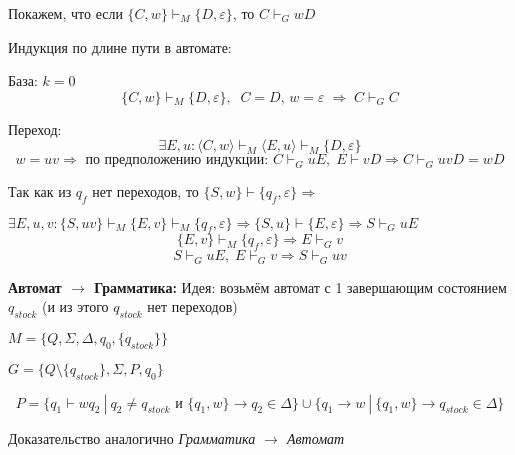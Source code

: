 Покажем, что если $\{C, w\} \vdash_{M} \{D, \varepsilon\}$, 
то $C \vdash_{G} wD$

Индукция по длине пути в автомате:

База: $k = 0$
$$
\{C, w\} \vdash_{M} 
\{D, \varepsilon\},  \;\; C = D, \, w = \varepsilon \;\Rightarrow\;
C \vdash_{G} C
$$

Переход:
$$
\exists E, u : \langle C, w\rangle \vdash_{M} \langle E, u\rangle \vdash_{M} \{D, \varepsilon\}
$$
$$
w = uv \Rightarrow \text{ по предположению индукции: }
C \vdash_{G} uE, \; E \vdash vD \Rightarrow
C \vdash_{G} uvD = wD
$$

Так как из $q_f$ нет переходов, то $\{S, w\} \vdash \{q_f, \varepsilon\} \Rightarrow$

$\exists E, u, v: \{S, uv\} \vdash_{M} 
\{E, v\} \vdash_{M} 
\{q_f, \varepsilon\} \Rightarrow
\{S, u\} \vdash \{E, \varepsilon\} \Rightarrow
S \vdash_{G} uE
$
$$
\{E, v\} \vdash_{M} \{q_f, \varepsilon\} \Rightarrow
E \vdash_{G} v
$$
$$
S \vdash_{G} uE, \; E \vdash_{G} v \Rightarrow S \vdash_{G} uv
$$

\textbf{Автомат $\rightarrow$ Грамматика:}
Идея: возьмём автомат с 1 завершающим состоянием $q_{stock}$ (и из этого $q_{stock}$ нет переходов)

$M = \{Q, \Sigma, \Delta, q_0, \{q_{stock}\}\}$

$G = \{Q \setminus \{q_{stock}\}, \Sigma, P, q_0\}$

$$
P = \{q_1 \vdash wq_2\ |\ q_2 \neq q_{stock} \text{ и } 
\{q_1, w\} \rightarrow q_2 \in \Delta \} \cup
\{q_1 \rightarrow w\ |\ \{q_1, w\} \rightarrow q_{stock} \in \Delta \}
$$

Доказательство аналогично \textit{Грамматика $\rightarrow$ Автомат}